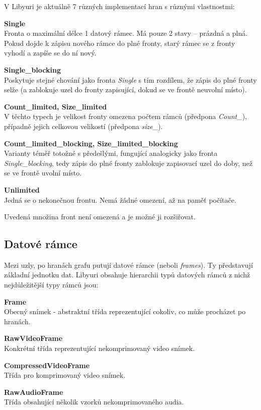 \documentclass[thesis=M,czech]{FITthesis}[2012/06/26]
\begin{document}
V Libyuri je aktuálně 7 různých implementací hran s různými vlastnostmi:
\begin{description}
  \item \textbf{Single\\}
Fronta o maximální délce 1 datový rámec. Má pouze 2 stavy -- prázdná a plná. Pokud dojde k zápisu nového rámce do plné fronty, starý rámec se z fronty vyhodí a zapíše se do ní nový.
  \item \textbf{Single\_blocking\\}
 Poskytuje stejné chování jako fronta \textit{Single} s tím rozdílem, že zápis do plné fronty selže (a zablokuje uzel do fronty zapisující, dokud se ve frontě neuvolní místo).
  \item \textbf{Count\_limited, Size\_limited\\}
 V těchto typech je velikost fronty omezena počtem rámců (předpona \textit{Count\_}), případně jejich celkovou velikostí (předpona \textit{size\_}).
  \item \textbf{Count\_limited\_blocking, Size\_limited\_blocking\\}
  Varianty téměř totožné s předešlými, fungující analogicky jako fronta \textit{Single\_blocking}, tedy zápis do plné fronty zablokuje zapisovací uzel do doby, než se ve frontě uvolní místo.
  \item \textbf{Unlimited\\}
Jedná se o nekonečnou frontu. Nemá žádné omezení, až na paměť počítače.
\end{description}

Uvedená množina front není omezená a je možné ji rozšiřovat.

\subsection{Datové rámce} \label{subsec:analyza_yuri_ramce}
Mezi uzly, po hranách grafu putují datové rámce (neboli \textit{frames}). Ty představují základní jednotku dat. Libyuri obsahuje hierarchii typů datových rámců z nichž nejdůležitější typy rámců jsou:
\begin{description}
  \item \textbf{Frame\\}
Obecný snímek - abstraktní třída reprezentující cokoliv, co může procházet po hranách.
  \item \textbf{RawVideoFrame\\}
Konkrétní třída reprezentující nekomprimovaný video snímek. 
  \item \textbf{CompressedVideoFrame \\}
Třída pro komprimovaný video snímek.
  \item \textbf{RawAudioFrame\\}
Třída obsahující několik vzorků nekomprimovaného audia.
\end{description}
\end{document}
